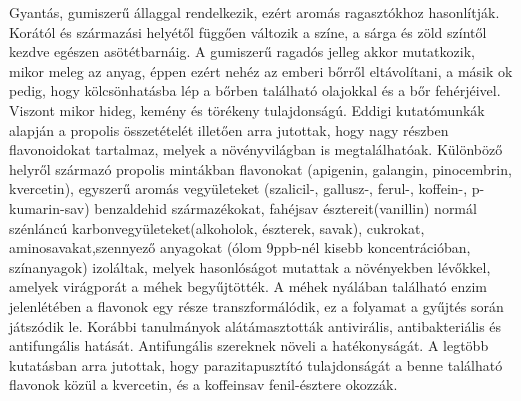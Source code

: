 {\sectionPropolis
Gyantás, gumiszerű állaggal rendelkezik, ezért aromás ragasztókhoz hasonlítják. Korától és származási helyétől függően változik a színe, a sárga és zöld színtől kezdve egészen asötétbarnáig. A gumiszerű ragadós jelleg akkor mutatkozik, mikor meleg az anyag, éppen ezért nehéz az emberi bőrről eltávolítani, a másik ok pedig, hogy kölcsönhatásba lép a bőrben található olajokkal és a bőr fehérjéivel. Viszont mikor hideg, kemény és törékeny tulajdonságú. Eddigi kutatómunkák alapján a propolis összetételét illetően arra jutottak, hogy nagy részben flavonoidokat tartalmaz, melyek a növényvilágban is megtalálhatóak. Különböző helyről származó propolis mintákban flavonokat (apigenin, galangin, pinocembrin, kvercetin), egyszerű aromás vegyületeket (szalicil-, gallusz-, ferul-, koffein-, p-kumarin-sav) benzaldehid származékokat, fahéjsav észtereit(vanillin) normál szénláncú karbonvegyületeket(alkoholok, észterek, savak), cukrokat, aminosavakat,szennyező anyagokat (ólom 9ppb-nél kisebb koncentrációban, színanyagok) izoláltak, melyek hasonlóságot mutattak a növényekben lévőkkel, amelyek virágporát a méhek begyűjtötték. A méhek nyálában található enzim jelenlétében a flavonok egy része transzformálódik, ez a folyamat a gyűjtés során játszódik le.  Korábbi tanulmányok alátámasztották antivirális, antibakteriális és antifungális hatását. Antifungális szereknek növeli a hatékonyságát. A legtöbb kutatásban arra jutottak, hogy parazitapusztító tulajdonságát a benne található flavonok közül a kvercetin, és a koffeinsav fenil-észtere okozzák. 

}
